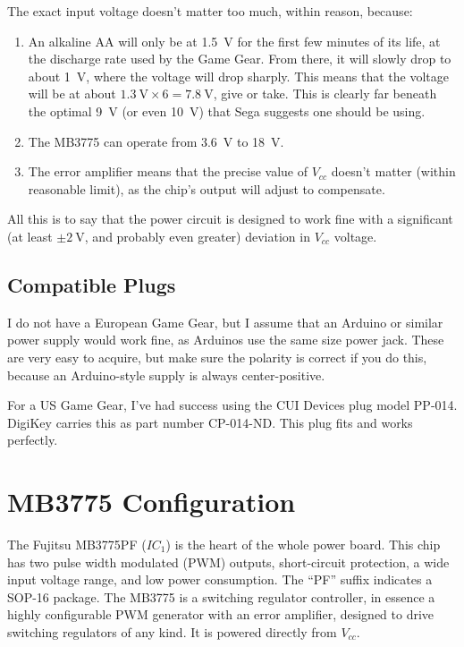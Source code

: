 \documentclass{article}
\newcommand{\Vcc}{$V_{cc}$}
\newcommand{\model}{\textsf}
\begin{document}
The exact input voltage doesn't matter too much, within reason,
because:

\begin{enumerate}
\item An alkaline AA will only be at \qty{1.5}{\volt} for the first
  few minutes of its life, at the discharge rate used by the Game
  Gear. From there, it will slowly drop to about \qty{1}{\volt}, where
  the voltage will drop sharply. This means that the voltage will be
  at about $\qty{1.3}{\volt} \times{} 6 = \qty{7.8}{\volt}$, give or
  take. This is clearly far beneath the optimal \qty{9}{\volt} (or
  even \qty{10}{\volt}) that Sega suggests one should be using.
\item The \model{MB3775} can operate from \qty{3.6}{\volt} to
  \qty{18}{\volt}. 
\item The error amplifier means that the precise value of \Vcc{}
  doesn't matter (within reasonable limit), as the chip's output will
  adjust to compensate.
\end{enumerate}

All this is to say that the power circuit is designed to work fine
with a significant (at least $\pm{}\qty{2}{\volt}$, and probably even
greater) deviation in \Vcc{} voltage. 

\subsection{Compatible Plugs}
I do not have a European Game Gear, but I assume that an Arduino or
similar power supply would work fine, as Arduinos use the same size
power jack. These are very easy to acquire, but make sure the polarity
is correct if you do this, because an Arduino-style supply is always
center-positive.

For a US Game Gear, I've had success using the CUI Devices plug model
\model{PP-014}. DigiKey carries this as part number
\model{CP-014-ND}. This plug fits and works perfectly.

\section{\model{MB3775} Configuration}
The Fujitsu \model{MB3775PF} ($IC_1$) is the heart of the whole power
board. This chip has two pulse width modulated (PWM) outputs,
short-circuit protection, a wide input voltage range, and low power
consumption. The ``\model{PF}'' suffix indicates a \model{SOP-16}
package. The \model{MB3775} is a switching regulator controller, in
essence a highly configurable PWM generator with an error amplifier,
designed to drive switching regulators of any kind. It is powered
directly from \Vcc{}.
\end{document}
